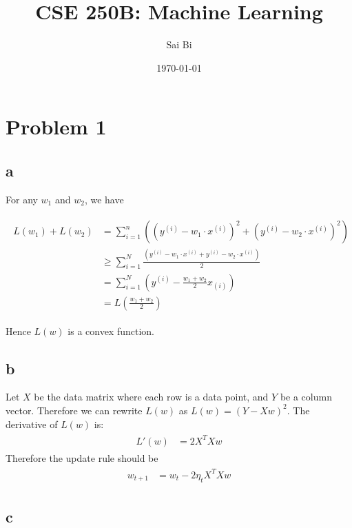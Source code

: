 \documentclass[a4paper,11pt]{article}
\theoremstyle{mytheor}
\newcommand{\myequ}[1]{\begin{align}\begin{split} #1 \end{split}\end{align}}
\begin{document}
\title{CSE 250B: Machine Learning}

\author{Sai Bi}

\date{\today}

\maketitle

\section*{Problem 1}
\subsection*{a}
For any $w_1$ and $w_2$, we have

\begin{align}
	\begin{split}
		L(w_1) + L(w_2) &= \sum_{i=1}^{n} ((y^{(i)} - w_1 \cdot x^{(i)})^2 + (y^{(i)} - w_2 \cdot x^{(i)})^2) \\
						& \geq  \sum_{i=1}^{N}\frac{(y^{(i)} -  w_1 \cdot x^{(i)} + y^{(i)} -  w_2 \cdot x^{(i)} ) }{2} \\
					& = \sum_{i=1}^{N} (y^{(i)} - \frac{w_1 + w_2}{2} x_{(i)}) \\
					& = L(\frac{w_1+w_2}{2})
	\end{split}
\end{align}

Hence $L(w)$ is a convex function.

\subsection*{b}
Let $X$  be the data matrix where each row is a data point, and $Y$ be a column vector. Therefore we can rewrite $L(w)$
as $L(w) = (Y - Xw)^2$. The derivative of $L(w)$ is:
\myequ{
	L'(w) &= 2X^T Xw 
}
Therefore the update rule should be 
\myequ{
	w_{t+1} &= w_t - 2\eta_{t} X^T Xw 
}

\subsection*{c}
\end{document}
